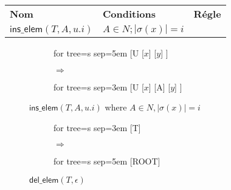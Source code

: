 \begin{table}
	\begin{tabular}{|l|l|c|}
		\vline
		\textbf{Nom} & \textbf{Conditions} & \textbf{Régle} \\
		\vline
		\vline
		$\textsf{ins\_elem}(T, A, u.i)$ & $A \in N; |\sigma(x)| = i$ & 
		\vline
	\end{tabular}
\end{table}


\begin{figure}[H]
	\centering
	\begin{subfigure}{0.4\textwidth}
		\centering
		\begin{adjustbox}{valign=c, max width=\textwidth}
			\begin{forest}
			for tree={s sep=5em}
			[U
				[$x$]
				[$y$]
			]
			\end{forest}
		\end{adjustbox}
		\caption{}
	\end{subfigure}
	\begin{subfigure}{0.1\textwidth}
		\centering
		\huge{$\Rightarrow$}
	\end{subfigure}
	\begin{subfigure}{0.4\textwidth}
		\centering
		\begin{adjustbox}{valign=c, max width=\textwidth}
			\begin{forest}
			for tree={s sep=3em}
			[U
				[$x$]
				[A]
				[$y$]
			]
			\end{forest}
		\end{adjustbox}
		\caption{}
	\end{subfigure}
	\caption{$\textsf{ins\_elem}(T, A, u.i)$ where $A \in N, |\sigma(x)| = i$}
	\label{fig:sch:op:insElem}
\end{figure}


\begin{figure}[H]
	\centering
	\begin{subfigure}{0.4\textwidth}
		\centering
		\begin{adjustbox}{valign=c, max width=\textwidth}
			\begin{forest}
			for tree={s sep=3em}
			[T]
			\end{forest}
		\end{adjustbox}
		\caption{}
	\end{subfigure}
	\begin{subfigure}{0.1\textwidth}
		\centering
		\huge{$\Rightarrow$}
	\end{subfigure}
	\begin{subfigure}{0.4\textwidth}
		\centering
		\begin{adjustbox}{valign=c, max width=\textwidth}
			\begin{forest}
			for tree={s sep=5em}
			[ROOT]
			\end{forest}
		\end{adjustbox}
		\caption{}
	\end{subfigure}
	\caption{$\textsf{del\_elem}(T, \epsilon)$}
	\label{fig:sch:op:insElem}
\end{figure}


